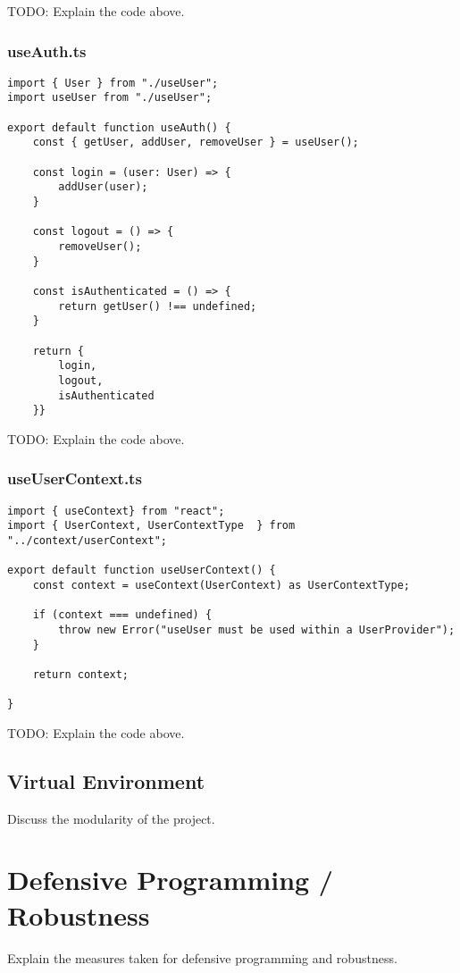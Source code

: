 TODO: Explain the code above.

\subsubsection{useAuth.ts}
\begin{verbatim}
import { User } from "./useUser";
import useUser from "./useUser";

export default function useAuth() {
    const { getUser, addUser, removeUser } = useUser();

    const login = (user: User) => {
        addUser(user);
    }

    const logout = () => {
        removeUser();
    }

    const isAuthenticated = () => {
        return getUser() !== undefined;
    }

    return {
        login,
        logout,
        isAuthenticated
    }}

\end{verbatim}

TODO: Explain the code above.

\subsubsection{useUserContext.ts}
\begin{verbatim}
import { useContext} from "react";
import { UserContext, UserContextType  } from "../context/userContext";

export default function useUserContext() {
    const context = useContext(UserContext) as UserContextType;

    if (context === undefined) {
        throw new Error("useUser must be used within a UserProvider");
    }

    return context;

}
\end{verbatim}


TODO: Explain the code above.






\subsection{Virtual Environment}
Discuss the modularity of the project.

\section{Defensive Programming / Robustness}
Explain the measures taken for defensive programming and robustness.

